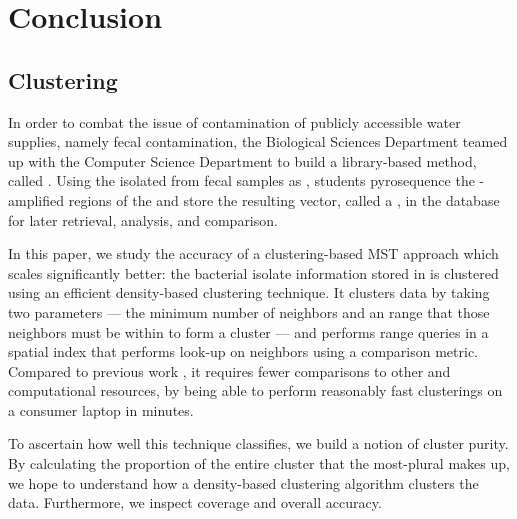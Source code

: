 \chapter{Conclusion}\label{chap:conclusion}
\section{Clustering \Isols{}}
In order to combat the issue of contamination of publicly accessible water supplies, namely fecal contamination, the \cp{} Biological Sciences Department teamed up with the \cp{} Computer Science Department to build a library-based \mst{} method, called \cplop{}.
Using the \ecoli{} isolated from fecal samples as \fiblong{}, \cp{} students pyrosequence the \pcr{}-amplified \itslong{} regions of the \ecoli{} and store the resulting vector, called a \pyro{}, in the \cplop{} database for later retrieval, analysis, and comparison.



In this paper, we study the accuracy of a clustering-based MST approach which scales significantly better: the bacterial isolate information stored in \cplop{} is clustered using an efficient density-based clustering technique.
It clusters data by taking two parameters --- the minimum number of neighbors and an \eps{} range that those neighbors must be within to form a cluster --- and performs range queries in a spatial index that performs  look-up on neighbors using a comparison metric.
Compared to previous work \cite{DBLP:conf/bibm/McGovernDKBVG15, montana2013ontological}, it requires fewer comparisons to other \isols{} and computational resources, by being able to perform reasonably fast clusterings on a consumer laptop in minutes.

To ascertain how well this technique classifies, we build a notion of cluster purity.
By calculating the proportion of the entire cluster that the most-plural \spec{} makes up, we hope to understand how a density-based clustering algorithm clusters the \cplop{} data.
Furthermore, we inspect coverage and overall accuracy.

